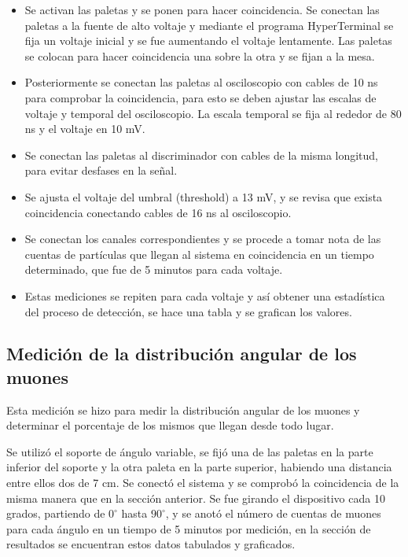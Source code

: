 \documentclass[a4paper,10pt]{article}
\numberwithin{equation}{section}
\begin{document}
\begin{itemize}
 \item Se activan las paletas y se ponen para hacer coincidencia. Se conectan las paletas a la fuente de alto voltaje y 
 mediante el programa HyperTerminal se fija un voltaje inicial y se fue aumentando el voltaje lentamente. Las paletas 
 se colocan para hacer coincidencia una sobre la otra y se fijan a la mesa.
 \item Posteriormente se conectan las paletas al osciloscopio con cables de 10 ns  para comprobar la coincidencia, para esto se deben ajustar 
 las escalas de voltaje y temporal del osciloscopio. La escala temporal se fija al rededor de 80 ns y 
 el voltaje en 10 mV.
 \item Se conectan las paletas al discriminador con cables de la misma longitud, para evitar desfases en la señal.
 \item Se ajusta el voltaje del umbral (threshold) a 13 mV, y se revisa que exista coincidencia conectando cables de 
 16 ns al osciloscopio.
 \item Se conectan los canales correspondientes y se procede a tomar nota de las cuentas de partículas que llegan al sistema
 en coincidencia en un tiempo determinado, que fue de 5 minutos para cada voltaje.
 \item Estas mediciones se repiten para cada voltaje y así obtener una estadística del proceso de detección, se hace una tabla y 
 se grafican los valores.
\end{itemize}


\subsection{Medición de la distribución angular de los muones}
\label{ss:medicionangulos}

Esta medición se hizo para medir la distribución angular de los muones y determinar 
el porcentaje de los mismos que llegan desde todo lugar.

\vspace{.3cm}

Se utilizó el soporte de ángulo variable, se fijó una de las paletas en la parte 
inferior del soporte y la otra paleta en la parte superior, habiendo una distancia 
entre ellos dos de 7 cm. Se conectó el sistema y se comprobó la coincidencia
de la misma manera que en la sección anterior. Se fue girando el dispositivo cada 
10 grados, partiendo de $0^\circ$ hasta $90^\circ$, y se anotó el número de cuentas 
de muones para cada ángulo en un tiempo de 5 minutos por medición, en la sección
de resultados se encuentran estos datos tabulados y graficados.
\end{document}
